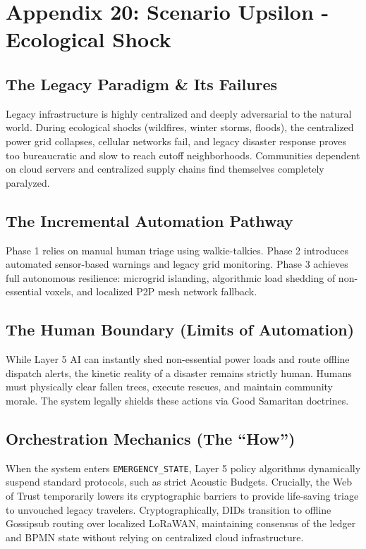 \chapter{Appendix 20: Scenario Upsilon - Ecological Shock}

\section{The Legacy Paradigm \& Its Failures}
Legacy infrastructure is highly centralized and deeply adversarial to the natural world. During ecological shocks (wildfires, winter storms, floods), the centralized power grid collapses, cellular networks fail, and legacy disaster response proves too bureaucratic and slow to reach cutoff neighborhoods. Communities dependent on cloud servers and centralized supply chains find themselves completely paralyzed.

\section{The Incremental Automation Pathway}
Phase 1 relies on manual human triage using walkie-talkies. Phase 2 introduces automated sensor-based warnings and legacy grid monitoring. Phase 3 achieves full autonomous resilience: microgrid islanding, algorithmic load shedding of non-essential voxels, and localized P2P mesh network fallback. 

\section{The Human Boundary (Limits of Automation)}
While Layer 5 AI can instantly shed non-essential power loads and route offline dispatch alerts, the kinetic reality of a disaster remains strictly human. Humans must physically clear fallen trees, execute rescues, and maintain community morale. The system legally shields these actions via Good Samaritan doctrines.

\section{Orchestration Mechanics (The ``How'')}
When the system enters \texttt{EMERGENCY\_STATE}, Layer 5 policy algorithms dynamically suspend standard protocols, such as strict Acoustic Budgets. Crucially, the Web of Trust temporarily lowers its cryptographic barriers to provide life-saving triage to unvouched legacy travelers. Cryptographically, DIDs transition to offline Gossipsub routing over localized LoRaWAN, maintaining consensus of the ledger and BPMN state without relying on centralized cloud infrastructure.
